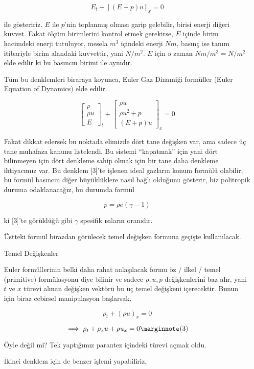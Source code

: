 \documentclass[12pt,fleqn]{article}\usepackage{../../common}
\begin{document}
$$
E_t + [(E + p) u ]_x = 0
$$

ile gösteririz. $E$ ile $p$'nin toplanmış olması garip gelebilir, birisi enerji
diğeri kuvvet. Fakat ölçüm birimlerini kontrol etmek gerekirse, $E$ içinde birim
hacimdeki enerji tutuluyor, mesela $m^3$ içindeki enerji $N m$, basınç ise tanım
itibariyle birim alandaki kuvvettir, yani $N / m^2$. $E$ için o zaman
$N m / m^3 = N / m^2$ elde edilir ki bu basıncın birimi ile aynıdır.

Tüm bu denklemleri biraraya koyunca, Euler Gaz Dinamiği formüller (Euler
Equation of Dynamics) elde edilir.

$$
\left[\begin{array}{c}
\rho \\ \rho u  \\ E
\end{array}\right]_t
+
\left[\begin{array}{c}
\rho u \\ \rho u^2 + p \\ (E+p) u 
\end{array}\right]_x 
= 0
$$

Fakat dikkat edersek bu noktada elimizde dört tane değişken var, ama sadece üç
tane muhafaza kanunu listelendi. Bu sistemi ``kapatmak'' için yani dört
bilinmeyen için dört denkleme sahip olmak için bir tane daha denkleme
ihtiyacımız var. Bu denklem [3]'te işlenen ideal gazların konum formülü
olabilir, bu formül basıncın diğer büyüklüklere nasıl bağlı olduğunu
gösterir, biz politropik duruma odaklanacağız, bu durumda formül

$$
p = \rho e (\gamma - 1)
$$

ki [3]'te görüldüğü gibi $\gamma$ spesifik ısıların oranıdır.

Üstteki formül birazdan görülecek temel değişken formuna geçişte kullanılacak.

Temel Değişkenler

Euler formüllerinin belki daha rahat anlaşılacak formu öz / ilkel / temel
(primitive) formülasyonu diye bilinir ve sadece $\rho,u,p$ değişkenlerini baz
alır, yani $t$ ve $x$ türevi alınan değişken vektörü bu üç temel değişkeni
içerecektir. Bunun için biraz cebirsel manipulasyon
başlarsak,

$$
\rho_t + (\rho u)_x = 0 
$$

$$
\implies \rho_t + \rho_x u + \rho u_x = 0
\mlabel{3}
$$

Öyle değil mi? Tek yaptığımız parantez içindeki türevi açmak oldu. 

İkinci denklem için de benzer işlemi yapabiliriz,
\end{document}
